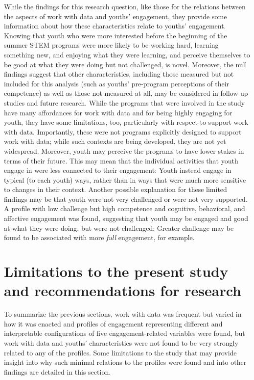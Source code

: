 \documentclass[]{book}
\theoremstyle{definition}
\theoremstyle{definition}
\theoremstyle{definition}
\theoremstyle{remark}
\begin{document}
While the findings for this research question, like those for the
relations between the aspects of work with data and youths' engagement,
they provide some information about how these characteristics relate to
youths' engagement. Knowing that youth who were more interested before
the beginning of the summer STEM programs were more likely to be working
hard, learning something new, and enjoying what they were learning, and
perceive themselves to be good at what they were doing but not
challenged, is novel. Moreover, the null findings suggest that other
characteristics, including those measured but not included for this
analysis (such as youths' pre-program perceptions of their competence)
as well as those not measured at all, may be considered in follow-up
studies and future research. While the programs that were involved in
the study have many affordances for work with data and for being highly
engaging for youth, they have some limitations, too, particularly with
respect to support work with data. Importantly, these were not programs
explicitly designed to support work with data; while such contexts are
being developed, they are not yet widespread. Moreover, youth may
perceive the programs to have lower stakes in terms of their future.
This may mean that the individual activities that youth engage in were
less connected to their engagement: Youth instead engage in typical (to
each youth) ways, rather than in ways that were much more sensitive to
changes in their context. Another possible explanation for these limited
findings may be that youth were not very challenged or were not very
supported. A profile with low challenge but high competence and
cognitive, behavioral, and affective engagement was found, suggesting
that youth may be engaged and good at what they were doing, but were not
challenged: Greater challenge may be found to be associated with more
\emph{full} engagement, for example.

\section{Limitations to the present study and recommendations for
research}\label{limitations-to-the-present-study-and-recommendations-for-research}

To summarize the previous sections, work with data was frequent but
varied in how it was enacted and profiles of engagement representing
different and interpretable configurations of five engagement-related
variables were found, but work with data and youths' characteristics
were not found to be very strongly related to any of the profiles. Some
limitations to the study that may provide insight into why such minimal
relations to the profiles were found and into other findings are
detailed in this section.
\end{document}
